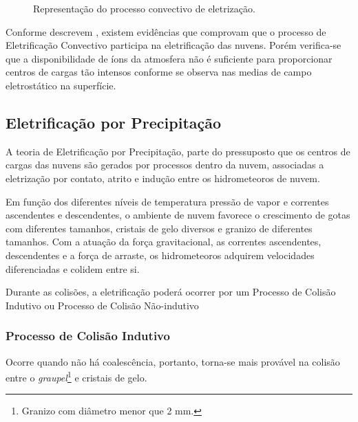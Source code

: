 \begin{figure}[ht]
   \centering
   \caption{Representação do processo convectivo de eletrização.}
   \label{fig:elec}
\end{figure}

Conforme descrevem , existem evidências que comprovam que o processo de Eletrificação Convectivo participa na eletrificação das nuvens. Porém verifica-se que a disponibilidade de íons da atmosfera não é suficiente para proporcionar centros de cargas tão intensos conforme se observa nas medias de campo eletrostático na superfície. 

\subsection{Eletrificação por Precipitação}

A teoria de Eletrificação por Precipitação, parte do pressuposto que os centros de cargas das nuvens são gerados por processos dentro da nuvem, associadas a eletrização por contato, atrito e indução entre os hidrometeoros de nuvem. 

Em função dos diferentes níveis de temperatura pressão de vapor e correntes ascendentes e descendentes, o ambiente de nuvem favorece o crescimento de gotas com diferentes tamanhos, cristais de gelo diversos e granizo de diferentes tamanhos. Com a atuação da força gravitacional, as correntes ascendentes, descendentes e a força de arraste, os hidrometeoros adquirem velocidades diferenciadas e colidem entre si.


Durante as colisões, a eletrificação poderá ocorrer por um Processo de Colisão Indutivo ou Processo de Colisão Não-indutivo


\subsubsection{Processo de Colisão Indutivo} 

Ocorre quando não há coalescência, portanto, torna-se mais provável na colisão entre o \textit{graupel}\footnote{Granizo com diâmetro menor que 2 mm.} e cristais de gelo.

